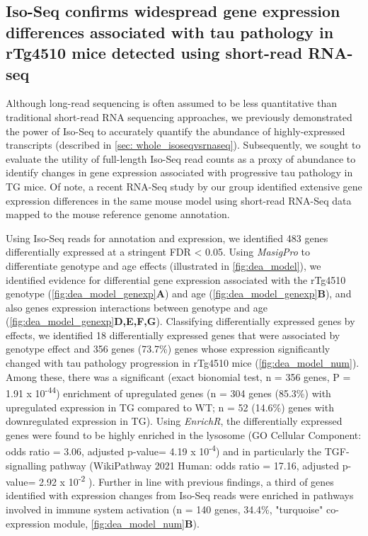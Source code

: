 \subsection{Iso-Seq confirms widespread gene expression differences associated with tau pathology in rTg4510 mice detected using short-read RNA-seq}
\label{ch5: diffgeneexp}
Although long-read sequencing is often assumed to be less quantitative than traditional short-read RNA sequencing approaches, we previously demonstrated the power of Iso-Seq to accurately quantify the abundance of highly-expressed transcripts (described in \cref{sec: whole_isoseqvsrnaseq}). Subsequently, we sought to evaluate the utility of full-length Iso-Seq read counts as a proxy of abundance to identify changes in gene expression associated with progressive tau pathology in TG mice. Of note, a recent RNA-Seq study by our group identified extensive gene expression differences in the same mouse model using short-read RNA-Seq data mapped to the mouse reference genome annotation\cite{Castanho2020}.

Using Iso-Seq reads for annotation and expression, we identified 483 genes differentially expressed at a stringent FDR < 0.05. Using \textit{MasigPro} to differentiate genotype and age effects (illustrated in \cref{fig:dea_model}), we identified evidence for differential gene expression associated with the rTg4510 genotype (\cref{fig:dea_model_genexp}\textbf{A}) and age (\cref{fig:dea_model_genexp}\textbf{B}), and also genes expression interactions between genotype and age (\cref{fig:dea_model_genexp}\textbf{D,E,F,G}). Classifying differentially expressed genes by effects, we identified 18 differentially expressed genes that were associated by genotype effect and 356 genes (73.7\%) genes whose expression significantly changed with tau pathology progression in rTg4510 mice (\cref{fig:dea_model_num}). Among these, there was a significant (exact bionomial test, n = 356 genes, P = 1.91 x 10\textsuperscript{-44}) enrichment of upregulated genes (n = 304 genes (85.3\%) with upregulated expression in TG compared to WT; n = 52 (14.6\%) genes with downregulated expression in TG). Using \textit{EnrichR}, the differentially expressed genes were found to be highly enriched in the lysosome (GO Cellular Component: odds ratio = 3.06, adjusted p-value= 4.19 x 10\textsuperscript{-4}) and in particularly the TGF-\textbeta signalling pathway (WikiPathway 2021 Human: odds ratio = 17.16, adjusted p-value= 2.92 x 10\textsuperscript{-2} ). Further in line with previous findings, a third of genes identified with expression changes from Iso-Seq reads were enriched in pathways involved in immune system activation (n = 140 genes, 34.4\%, "turquoise" co-expression module\cite{Castanho2020}, \cref{fig:dea_model_num}\textbf{B}). 


